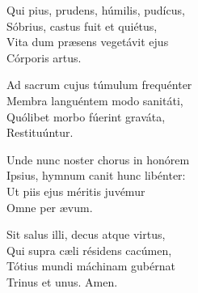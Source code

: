 Qui pius, prudens, húmilis, pudícus,\\
Sóbrius, castus fuit et quiétus,\\
Vita dum præsens vegetávit ejus\\
Córporis artus.

Ad sacrum cujus túmulum frequénter\\
Membra languéntem modo sanitáti,\\
Quólibet morbo fúerint graváta,\\
Restituúntur.

Unde nunc noster chorus in honórem\\
I\-psius, hy\-mnum canit hunc libénter:\\
Ut piis ejus méritis juvémur\\
Omne per ævum.

Sit salus illi, decus atque virtus,\\
Qui supra cæli résidens cacúmen,\\
Tótius mundi máchinam gubérnat\\
Trinus et unus.
Amen.